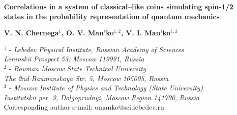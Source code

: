 \documentclass[12pt]{article}
\begin{document}
%
\begin{center} 
{\Large \bf{
Correlations in a system of classical--like coins simulating spin-1/2 states in the probability representation of quantum mechanics}}
\end{center}
\begin{center} 
{\bf V. N. Chernega$^1$, O. V. Man'ko$^{1,2}$, V. I. Man'ko$^{1,3}$}
\end{center}

\medskip

\begin{center}
$^1$ - {\it Lebedev Physical Institute, Russian Academy of Sciences\\
Leninskii Prospect 53, Moscow 119991, Russia}\\
$^2$ - {\it Bauman Moscow State Technical University\\
The 2nd Baumanskaya Str. 5, Moscow 105005, Russia}\\
$^3$ - {\it Moscow Institute of Physics and Technology (State University)\\
Institutskii per. 9, Dolgoprudnyi, Moscow Region 141700, Russia}\\
Corresponding author e-mail: omanko@sci.lebedev.ru
\end{center}

\begin{abstract}
An analog of classical ``hidden variables" for qubit states is presented. The states of qubit (two-level atom, spin-1/2 particle) are mapped onto the states of three classical--like coins. The bijective map of the states corresponds to the presence of correlations of random classical--like variables associated with the coin positions ``up'' or ``down'' and the observables are mapped onto quantum observables described by Hermitian matrices. The connection of the classical--coin statistics with the statistical properties of qubits is found.  
\end{abstract}
\end{document}
